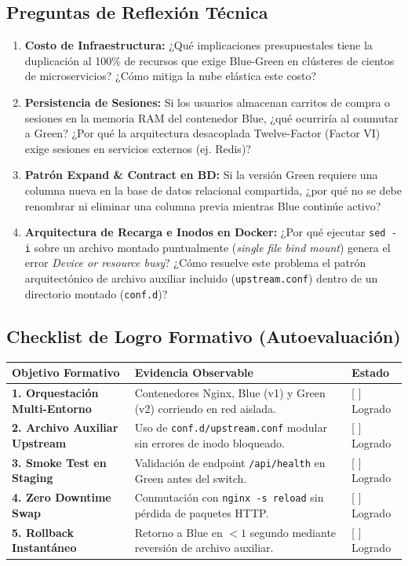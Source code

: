 \documentclass[10pt,letterpaper]{article}
\begin{document}
\subsection{Preguntas de Reflexión Técnica}
\begin{enumerate}[leftmargin=*,itemsep=2.5pt]
  \item \textbf{Costo de Infraestructura:} ¿Qué implicaciones presupuestales tiene la duplicación al 100\% de recursos que exige Blue-Green en clústeres de cientos de microservicios? ¿Cómo mitiga la nube elástica este costo?
  \item \textbf{Persistencia de Sesiones:} Si los usuarios almacenan carritos de compra o sesiones en la memoria RAM del contenedor Blue, ¿qué ocurriría al conmutar a Green? ¿Por qué la arquitectura desacoplada Twelve-Factor (Factor VI) exige sesiones en servicios externos (ej. Redis)?
  \item \textbf{Patrón Expand \& Contract en BD:} Si la versión Green requiere una columna nueva en la base de datos relacional compartida, ¿por qué no se debe renombrar ni eliminar una columna previa mientras Blue continúe activo?
  \item \textbf{Arquitectura de Recarga e Inodos en Docker:} ¿Por qué ejecutar \texttt{sed -i} sobre un archivo montado puntualmente (\textit{single file bind mount}) genera el error \textit{Device or resource busy}? ¿Cómo resuelve este problema el patrón arquitectónico de archivo auxiliar incluido (\texttt{upstream.conf}) dentro de un directorio montado (\texttt{conf.d})?
\end{enumerate}

\vspace{0.05cm}
\subsection{Checklist de Logro Formativo (Autoevaluación)}
\noindent
\small
\begin{tabularx}{\textwidth}{|L{4.2cm}|X|C{2.5cm}|}
\hline
{}
\textbf{Objetivo Formativo} & \textbf{Evidencia Observable} & \textbf{Estado} \\ \hline
\textbf{1. Orquestación Multi-Entorno} & Contenedores Nginx, Blue (v1) y Green (v2) corriendo en red aislada. & [ ] Logrado \\ \hline
\textbf{2. Archivo Auxiliar Upstream} & Uso de \texttt{conf.d/upstream.conf} modular sin errores de inodo bloqueado. & [ ] Logrado \\ \hline
\textbf{3. Smoke Test en Staging} & Validación de endpoint \texttt{/api/health} en Green antes del switch. & [ ] Logrado \\ \hline
\textbf{4. Zero Downtime Swap} & Conmutación con \texttt{nginx -s reload} sin pérdida de paquetes HTTP. & [ ] Logrado \\ \hline
\textbf{5. Rollback Instantáneo} & Retorno a Blue en $<1$ segundo mediante reversión de archivo auxiliar. & [ ] Logrado \\ \hline
\end{tabularx}
\end{document}
